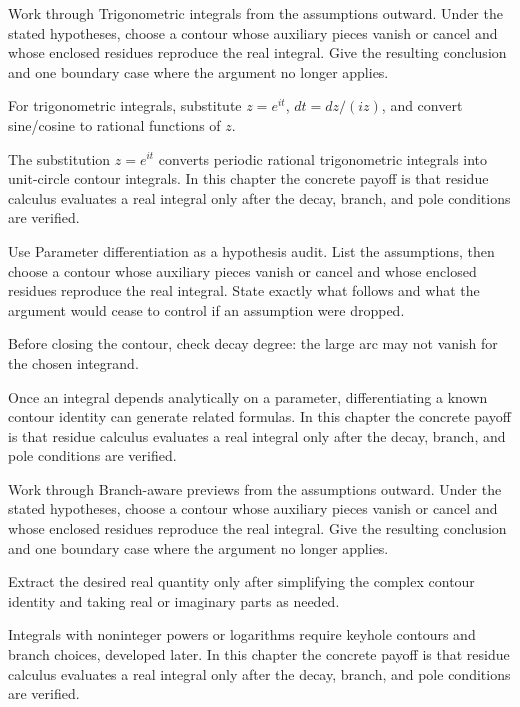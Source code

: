 \begin{exercise}\label{exr:iv11-06}
Work through Trigonometric integrals from the assumptions outward. Under the stated hypotheses, choose a contour whose auxiliary pieces vanish or cancel and whose enclosed residues reproduce the real integral. Give the resulting conclusion and one boundary case where the argument no longer applies.
\end{exercise}
\begin{hint}
For trigonometric integrals, substitute \(z=e^{it}\), \(dt=dz/(iz)\), and convert sine/cosine to rational functions of \(z\).
\end{hint}
\begin{solution}
The substitution $z=e^{it}$ converts periodic rational trigonometric integrals into unit-circle contour integrals. In this chapter the concrete payoff is that residue calculus evaluates a real integral only after the decay, branch, and pole conditions are verified.
\end{solution}

\begin{exercise}\label{exr:iv11-07}
Use Parameter differentiation as a hypothesis audit. List the assumptions, then choose a contour whose auxiliary pieces vanish or cancel and whose enclosed residues reproduce the real integral. State exactly what follows and what the argument would cease to control if an assumption were dropped.
\end{exercise}
\begin{hint}
Before closing the contour, check decay degree: the large arc may not vanish for the chosen integrand.
\end{hint}
\begin{solution}
Once an integral depends analytically on a parameter, differentiating a known contour identity can generate related formulas. In this chapter the concrete payoff is that residue calculus evaluates a real integral only after the decay, branch, and pole conditions are verified.
\end{solution}

\begin{exercise}\label{exr:iv11-08}
Work through Branch-aware previews from the assumptions outward. Under the stated hypotheses, choose a contour whose auxiliary pieces vanish or cancel and whose enclosed residues reproduce the real integral. Give the resulting conclusion and one boundary case where the argument no longer applies.
\end{exercise}
\begin{hint}
Extract the desired real quantity only after simplifying the complex contour identity and taking real or imaginary parts as needed.
\end{hint}
\begin{solution}
Integrals with noninteger powers or logarithms require keyhole contours and branch choices, developed later. In this chapter the concrete payoff is that residue calculus evaluates a real integral only after the decay, branch, and pole conditions are verified.
\end{solution}

